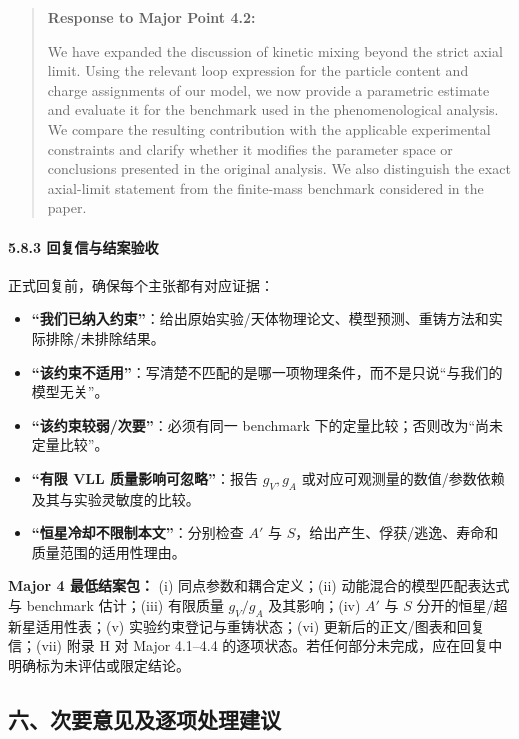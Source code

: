 \documentclass[
]{article}
\providecommand{\tightlist}{%
  \setlength{\itemsep}{0pt}\setlength{\parskip}{0pt}}
\begin{document}
\begin{quote}
\textbf{Response to Major Point 4.2:}

We have expanded the discussion of kinetic mixing beyond the strict
axial limit. Using the relevant loop expression for the particle content
and charge assignments of our model, we now provide a parametric
estimate and evaluate it for the benchmark used in the phenomenological
analysis. We compare the resulting contribution with the applicable
experimental constraints and clarify whether it modifies the parameter
space or conclusions presented in the original analysis. We also
distinguish the exact axial-limit statement from the finite-mass
benchmark considered in the paper.
\end{quote}

\paragraph{5.8.3
回复信与结案验收}\label{ux56deux590dux4fe1ux4e0eux7ed3ux6848ux9a8cux6536}

正式回复前，确保每个主张都有对应证据：

\begin{itemize}
\tightlist
\item
  \textbf{``我们已纳入约束''}：给出原始实验/天体物理论文、模型预测、重铸方法和实际排除/未排除结果。
\item
  \textbf{``该约束不适用''}：写清楚不匹配的是哪一项物理条件，而不是只说``与我们的模型无关''。
\item
  \textbf{``该约束较弱/次要''}：必须有同一 benchmark
  下的定量比较；否则改为``尚未定量比较''。
\item
  \textbf{``有限 VLL 质量影响可忽略''}：报告 \(g_V,g_A\)
  或对应可观测量的数值/参数依赖及其与实验灵敏度的比较。
\item
  \textbf{``恒星冷却不限制本文''}：分别检查 \(A'\) 与
  \(S\)，给出产生、俘获/逃逸、寿命和质量范围的适用性理由。
\end{itemize}

\textbf{Major 4 最低结案包：} (i) 同点参数和耦合定义；(ii)
动能混合的模型匹配表达式与 benchmark 估计；(iii) 有限质量 \(g_V/g_A\)
及其影响；(iv) \(A'\) 与 \(S\) 分开的恒星/超新星适用性表；(v)
实验约束登记与重铸状态；(vi) 更新后的正文/图表和回复信；(vii) 附录 H 对
Major 4.1--4.4
的逐项状态。若任何部分未完成，应在回复中明确标为未评估或限定结论。

\subsection{六、次要意见及逐项处理建议}\label{ux516dux6b21ux8981ux610fux89c1ux53caux9010ux9879ux5904ux7406ux5efaux8bae}
\end{document}
